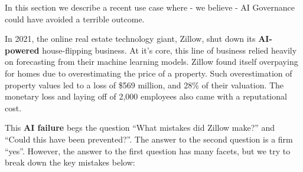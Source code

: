 \documentclass{article}
\begin{document}
In this section we describe a recent use case where - we believe - AI Governance could have avoided a terrible outcome. 

In 2021, the online real estate technology giant, Zillow, shut down its \textbf{AI-powered} house-flipping business.
At it's core, this line of business relied heavily on forecasting from their machine learning models.
Zillow found itself overpaying for homes due to overestimating the price of a property. 
Such overestimation of property values led to a loss of \$569 million, and 28\% of their valuation\cite{bloomberg, bloomberg2}. 
The monetary loss and laying off of 2,000 employees also came with a reputational cost.

This \textbf{AI failure} begs the question ``What mistakes did Zillow make?'' and ``Could this have been prevented?''. The answer to the second question is a firm ``yes''. However, the answer to the first question has many facets, but we try to break down the key mistakes below:
\end{document}
